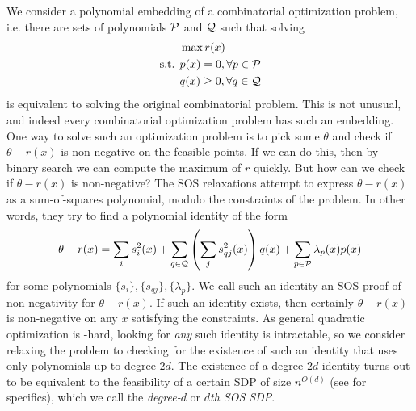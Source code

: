 We consider a polynomial embedding of a combinatorial optimization problem, i.e. there are sets of polynomials $\mathcal P$ and $\mathcal Q$ such that solving
\begin{align*}
&\max r(x) \\
\text{s.t. } &p(x) = 0, \forall p \in \mathcal P \\
&q(x) \geq 0, \forall q \in \mathcal Q
\end{align*}
is equivalent to solving the original combinatorial problem. This is not unusual, and indeed every combinatorial optimization problem has such an embedding. One way to solve such an optimization problem is to pick some $\theta$ and check if $\theta - r(x)$ is non-negative on the feasible points. If we can do this, then by binary search we can compute the maximum of $r$ quickly. But how can we check if $\theta - r(x)$ is non-negative? The SOS relaxations attempt to express $\theta - r(x)$ as a sum-of-squares polynomial, modulo the constraints of the problem. In other words, they try to find a polynomial identity of the form
\[\theta - r(x) = \sum_i s_i^2(x) + \sum_{q \in \mathcal Q} \left(\sum_j s_{qj}^2(x)\right)q(x) + \sum_{p\in\mathcal P} \lambda_p(x)p(x)\label{eq:intro_sos_proof}\]
for some polynomials $\{s_i\}, \{s_{qj}\}, \{\lambda_p\}$.
We call such an identity an SOS proof of non-negativity for $\theta - r(x)$.
If such an identity exists, then certainly $\theta - r(x)$ is non-negative on any $x$ satisfying the constraints. As general quadratic optimization is \np-hard, looking for \emph{any} such identity is intractable, so we consider relaxing the problem to checking for the existence of such an identity that uses only polynomials up to degree $2d$. The existence of a degree $2d$ identity turns out to be equivalent to the feasibility of a certain SDP of size $n^{O(d)}$ (see  for specifics), which we call the \emph{degree-$d$} or \emph{$d$th SOS SDP}.


